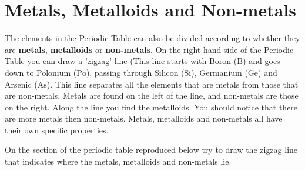            \section{Metals, Metalloids and Non-metals}
            \nopagebreak
      \label{m38708*id65693}The elements in the Periodic Table can also be divided according to whether they are \textbf{metals}, \textbf{metalloids} or \textbf{non-metals}. On the right hand side of the Periodic Table you can draw a 'zigzag' line (This line starts with Boron ($\mathrm{B}$) and goes down to Polonium ($\mathrm{Po}$), passing through Silicon ($\mathrm{Si}$), Germanium ($\mathrm{Ge}$) and Arsenic ($\mathrm{As}$). This line separates all the elements that are metals from those that are non-metals. Metals are found on the left of the line, and non-metals are those on the right. Along the line you find the metalloids. You should notice that there are more metals then non-metals. Metals, metalloids and non-metals all have their own specific properties.\par 
On the section of the periodic table reproduced below try to draw the zigzag line that indicates where the metals, metalloids and non-metals lie. \par
